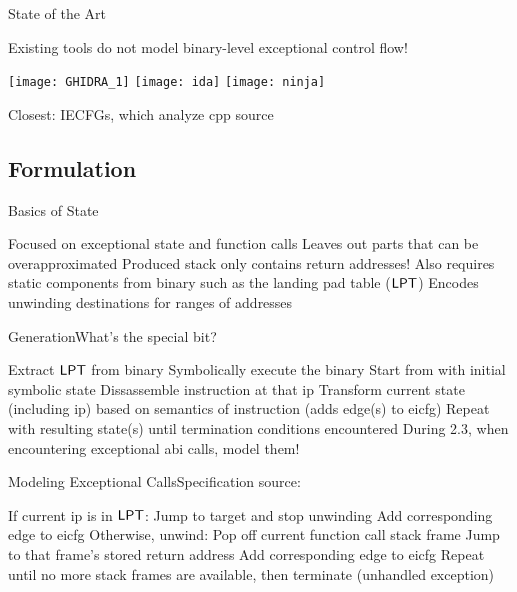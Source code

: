 \begin{frame}{State of the Art}
  \begin{outline}
    \1 Existing tools do not model binary-level exceptional control flow!
    \begin{center}
      \texttt{[image: GHIDRA\_1]}
      \hspace{1cm}
      \texttt{[image: ida]}
      \hspace{1cm}
      \texttt{[image: ninja]}
    \end{center}
    \1 Closest: IECFGs, which analyze \gls{cpp} source
  \end{outline}
\end{frame}

\subsection{Formulation}
\begin{frame}{Basics of State}
  \begin{outline}
    \1 Focused on \alert{exceptional state} and \alert{function calls}
    \1 Leaves out parts that can be overapproximated
      \2 Produced stack only contains return addresses!
    \1 Also requires static components from binary such as the \alert{landing pad table ($\operatorname{\mathsf{LPT}}$)}
      \2 Encodes unwinding destinations for ranges of addresses
  \end{outline}
\end{frame}

\begin{frame}{Generation}{What's the special bit?}
  \begin{outline}[enumerate]
    \1<+-> Extract $\operatorname{\mathsf{LPT}}$ from binary
    \1<+-> \alert{Symbolically execute} the binary
      \2<+-> Start from  with initial \alert{symbolic state}
      \2<+-> Dissassemble instruction at that \gls{ip}
      \2<+-> Transform current state (including \gls{ip}) based on semantics of instruction (adds edge(s) to \gls{eicfg})
      \2<+-> Repeat with resulting state(s) until termination conditions encountered
    \1<+-> \alert{During 2.3, when encountering exceptional \gls{abi} calls, model them!}
  \end{outline}
\end{frame}

\begin{frame}{Modeling Exceptional  Calls}{Specification source: }
  \begin{block}{}
    \begin{outline}[enumerate]
      \1<+-> If current \gls{ip} is in $\operatorname{\mathsf{LPT}}$:
        \2<+-> Jump to target and stop unwinding
        \2<+-> Add corresponding edge to \gls{eicfg}
      \1<+-> Otherwise, unwind:
        \2<+-> Pop off current function call stack frame
        \2<+-> Jump to that frame's stored return address
        \2<+-> Add corresponding edge to \gls{eicfg}
      \1<+-> Repeat until no more stack frames are available, then terminate (\alert{unhandled exception})
    \end{outline}
  \end{block}
\end{frame}

